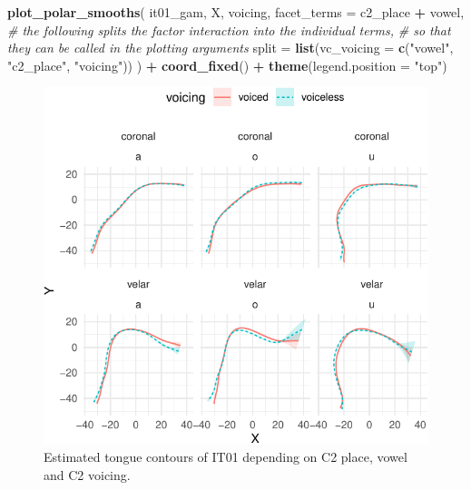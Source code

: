 \documentclass[
  11pt,
]{article}
\newenvironment{Shaded}{\begin{snugshade}}{\end{snugshade}}
\newcommand{\CommentTok}[1]{\textcolor[rgb]{0.56,0.35,0.01}{\textit{#1}}}
\newcommand{\DataTypeTok}[1]{\textcolor[rgb]{0.13,0.29,0.53}{#1}}
\newcommand{\KeywordTok}[1]{\textcolor[rgb]{0.13,0.29,0.53}{\textbf{#1}}}
\newcommand{\NormalTok}[1]{#1}
\newcommand{\OperatorTok}[1]{\textcolor[rgb]{0.81,0.36,0.00}{\textbf{#1}}}
\newcommand{\StringTok}[1]{\textcolor[rgb]{0.31,0.60,0.02}{#1}}
\begin{document}
\begin{Shaded}
\begin{Highlighting}[]
\KeywordTok{plot\_polar\_smooths}\NormalTok{(}
\NormalTok{  it01\_gam,}
\NormalTok{  X,}
\NormalTok{  voicing,}
  \DataTypeTok{facet\_terms =}\NormalTok{ c2\_place }\OperatorTok{+}\StringTok{ }\NormalTok{vowel,}
  \CommentTok{\# the following splits the factor interaction into the individual terms,}
  \CommentTok{\# so that they can be called in the plotting arguments}
  \DataTypeTok{split =} \KeywordTok{list}\NormalTok{(}\DataTypeTok{vc\_voicing =} \KeywordTok{c}\NormalTok{(}\StringTok{"vowel"}\NormalTok{, }\StringTok{"c2\_place"}\NormalTok{, }\StringTok{"voicing"}\NormalTok{))}
\NormalTok{) }\OperatorTok{+}
\StringTok{  }\KeywordTok{coord\_fixed}\NormalTok{() }\OperatorTok{+}
\StringTok{  }\KeywordTok{theme}\NormalTok{(}\DataTypeTok{legend.position =} \StringTok{"top"}\NormalTok{)}
\end{Highlighting}
\end{Shaded}

\begin{figure}

{\centering \includegraphics[width=\linewidth]{2018-polar-gam_files/figure-latex/Figure04} 

}

\caption{Estimated tongue contours of IT01 depending on C2 place, vowel and C2 voicing.}\label{f:Figure04}
\end{figure}
\end{document}
